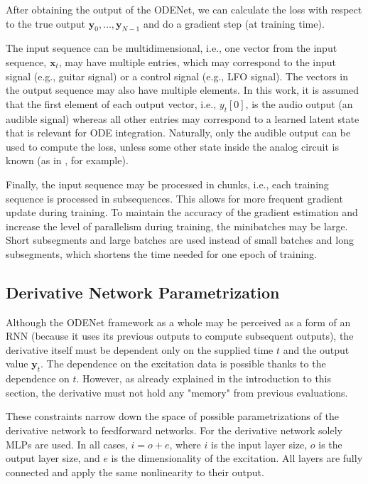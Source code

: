 After obtaining the output of the ODENet, we can calculate the loss with respect to the true output $\pmb{y}_0, \dots, \pmb{y}_{N-1}$ and do a gradient step (at training time).

The input sequence can be multidimensional, i.e., one vector from the input sequence, $\pmb{x}_t$, may have multiple entries, which may correspond to the input signal (e.g., guitar signal) or a control signal (e.g., \ac{LFO} signal). The vectors in the output sequence may also have multiple elements. In this work, it is assumed that the first element of each output vector, i.e., $y_t[0]$, is the audio output (an audible signal) whereas all other entries may correspond to a learned latent state that is relevant for \ac{ODE} integration. Naturally, only the audible output can be used to compute the loss, unless some other state inside the analog circuit is known (as in \cite{Parker2019}, for example).

Finally, the input sequence may be processed in chunks, i.e., each training sequence is processed in subsequences. This allows for more frequent gradient update during training. To maintain the accuracy of the gradient estimation and increase the level of parallelism during training, the minibatches may be large. Short subsegments and large batches are used instead of small batches and long subsegments, which shortens the time needed for one epoch of training.

\subsection{Derivative Network Parametrization}
\label{subsec:derivative_parametrization}

Although the ODENet framework as a whole may be perceived as a form of an \ac{RNN} (because it uses its previous outputs to compute subsequent outputs), the derivative itself must be dependent only on the supplied time $t$ and the output value $\pmb{y}_t$. The dependence on the excitation data is possible thanks to the dependence on $t$. However, as already explained in the introduction to this section, the derivative must not hold any "memory" from previous evaluations.

These constraints narrow down the space of possible parametrizations of the derivative network to feedforward networks. For the derivative network solely \acp{MLP} are used. In all cases, $i = o + e$, where $i$ is the input layer size, $o$ is the output layer size, and $e$ is the dimensionality of the excitation. All layers are fully connected and apply the same nonlinearity to their output.
